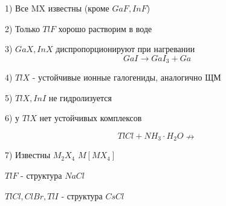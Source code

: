 1) Все MX известны (кроме $GaF, InF$)

2) Только $TlF$ хорошо растворим в воде

3) $GaX, InX$ диспропорционируют при нагревании
$$GaI \rightarrow GaI_3 + Ga$$

4) $TlX$ - устойчивые ионные галогениды, аналогично ЩМ

5) $TlX, InI$ не гидролизуется

6) у $TlX$ нет устойчивых комплексов

$$TlCl + NH_3\cdot H_2O \nrightarrow$$

7) Известны $M_2X_4$ $M[MX_4]$

$TlF$ - структура $NaCl$

$TlCl, ClBr, TlI$ - структура $CsCl$
